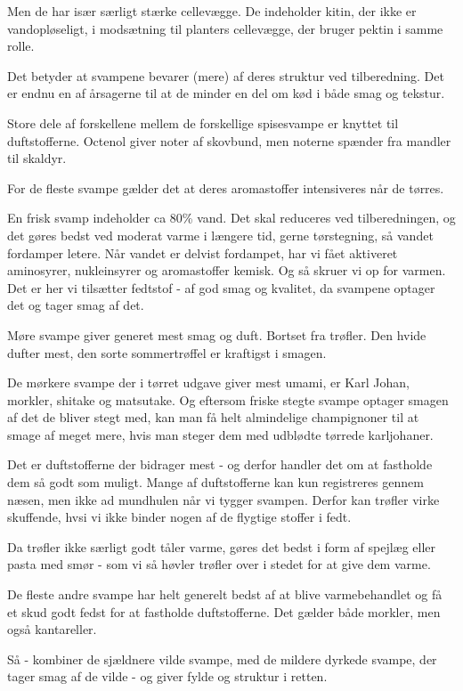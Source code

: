 \documentclass[
]{book}
\begin{document}
Men de har især særligt stærke cellevægge. De indeholder kitin, der ikke er
vandopløseligt, i modsætning til planters cellevægge, der bruger pektin i samme
rolle.

Det betyder at svampene bevarer (mere) af deres struktur ved tilberedning. Det
er endnu en af årsagerne til at de minder en del om kød i både smag og tekstur.

Store dele af forskellene mellem de forskellige spisesvampe er knyttet til duftstofferne.
Octenol giver noter af skovbund, men noterne spænder fra mandler til skaldyr.

For de fleste svampe gælder det at deres aromastoffer intensiveres når de tørres.

En frisk svamp indeholder ca 80\% vand. Det skal reduceres ved tilberedningen, og
det gøres bedst ved moderat varme i længere tid, gerne tørstegning, så vandet
fordamper letere. Når vandet er delvist fordampet, har vi fået aktiveret
aminosyrer, nukleinsyrer og aromastoffer kemisk. Og så skruer vi op for varmen.
Det er her vi tilsætter fedtstof - af god smag og kvalitet, da svampene optager
det og tager smag af det.

Møre svampe giver generet mest smag og duft. Bortset fra trøfler. Den hvide dufter
mest, den sorte sommertrøffel er kraftigst i smagen.

De mørkere svampe der i tørret udgave giver mest umami, er Karl Johan, morkler,
shitake og matsutake. Og eftersom friske stegte svampe optager smagen af det
de bliver stegt med, kan man få helt almindelige champignoner til at smage af
meget mere, hvis man steger dem med udblødte tørrede karljohaner.

Det er duftstofferne der bidrager mest - og derfor handler det om at fastholde
dem så godt som muligt. Mange af duftstofferne kan kun registreres gennem næsen,
men ikke ad mundhulen når vi tygger svampen. Derfor kan trøfler virke skuffende,
hvsi vi ikke binder nogen af de flygtige stoffer i fedt.

Da trøfler ikke særligt godt tåler varme, gøres det bedst i form af spejlæg eller
pasta med smør - som vi så høvler trøfler over i stedet for at give dem varme.

De fleste andre svampe har helt generelt bedst af at blive varmebehandlet og
få et skud godt fedst for at fastholde duftstofferne. Det gælder både morkler,
men også kantareller.

Så - kombiner de sjældnere vilde svampe, med de mildere dyrkede svampe,
der tager smag af de vilde - og giver fylde og struktur i retten.
\end{document}
